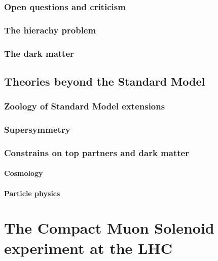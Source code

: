         \subsection{Open questions and criticism}
        \loremipsum
        \subsection{The hierachy problem}
        \loremipsum
        \subsection{The dark matter}
        \loremipsum

    \section{Theories beyond the Standard Model}
        \subsection{Zoology of Standard Model extensions}
        \loremipsum
        \subsection{Supersymmetry}
        \loremipsum
        \subsection{Constrains on top partners and dark matter}
        \loremipsum
            \subsubsection{Cosmology}
        \loremipsum
            \subsubsection{Particle physics}
        \loremipsum











\chapter{The Compact Muon Solenoid experiment at the LHC}


